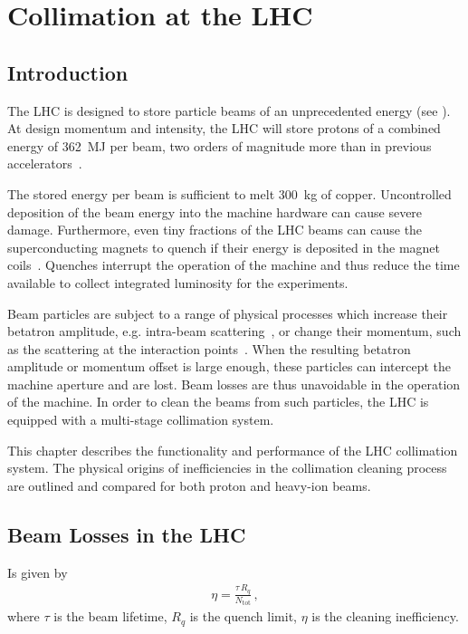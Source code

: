 \chapter{Collimation at the LHC}\label{chap:3}
%
\section*{Introduction}

%
The LHC is designed to store particle beams of an unprecedented energy (see ). At design momentum and intensity, the LHC will store protons of a combined energy of 362~MJ per beam, two orders of magnitude more than in previous accelerators~\cite{CERN-2004-003-V1,collimationsystemref1}. 

The stored energy per beam is sufficient to melt 300~kg of copper. Uncontrolled deposition of the beam energy into the machine hardware can cause severe damage. Furthermore, even tiny fractions of the LHC beams can cause the superconducting magnets to quench if their energy is deposited in the magnet coils~\cite{}. Quenches interrupt the operation of the machine and thus reduce the time available to collect integrated luminosity for the experiments. 

Beam particles are subject to a range of physical processes which increase their betatron amplitude, e.g. intra-beam scattering~\cite{Mertens:1364596}, or change their momentum, such as the scattering at the interaction points~\cite{Bruce2014a}. When the resulting betatron amplitude or momentum offset is large enough, these particles can intercept the machine aperture and are lost. Beam losses are thus unavoidable in the operation of the machine. In order to clean the beams from such particles, the LHC is equipped with a multi-stage collimation system. 

This chapter describes the functionality and performance of the LHC collimation system. The physical origins of inefficiencies in the collimation cleaning process are outlined and compared for both proton and heavy-ion beams.  
%
\section{Beam Losses in the LHC}
%
Is given by~\cite{lhcdr}
\begin{align}
  \eta = \frac{ \tau \, R_q}{N_\text{tot}} \, ,
\end{align}
where $\tau$ is the beam lifetime, $R_q$ is the quench limit, $\eta$ is the cleaning inefficiency.

